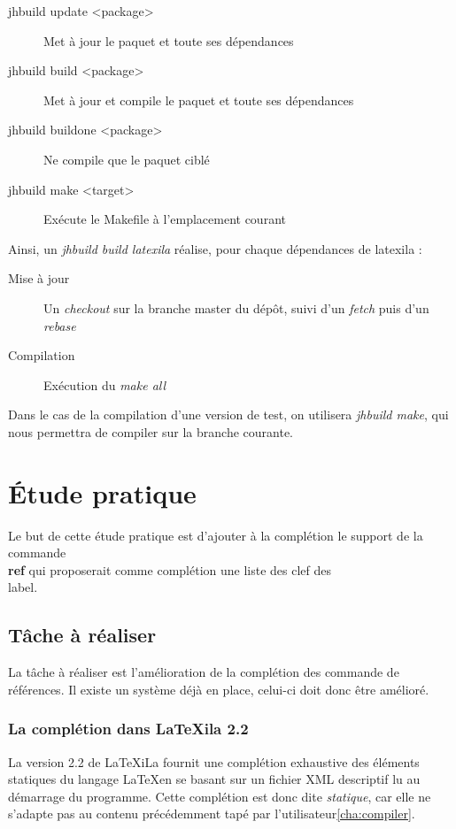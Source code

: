 \documentclass[a4paper,11pt]{report}
\begin{document}
\begin{description}
  \item[jhbuild update <package>] Met à jour le paquet et toute ses dépendances
  \item[jhbuild build <package>] Met à jour et compile le paquet et toute ses dépendances
  \item[jhbuild buildone <package>] Ne compile que le paquet ciblé
  \item[jhbuild make <target>] Exécute le Makefile à l'emplacement courant
\end{description}

Ainsi, un \textit{jhbuild build latexila} réalise, pour chaque dépendances de latexila :

\begin{description} 
  \item[Mise à jour] Un \textit{checkout} sur la branche master du dépôt, suivi d'un \textit{fetch} puis d'un \textit{rebase} 
  \item[Compilation] Exécution du \textit{make all}
\end{description}

Dans le cas de la compilation d'une version de test, on utilisera \textit{jhbuild make}, qui nous permettra de compiler sur la branche courante.

\chapter{Étude pratique} %
\label{cha:etude_pratique}
Le but de cette étude pratique est d'ajouter à la complétion le support de la commande \textbf{\\ref} qui proposerait comme complétion une liste des clef des \\label. 

\section{Tâche à réaliser} %
\label{sec:tache_a_realiser}
La tâche à réaliser est l'amélioration de la complétion des commande de références. Il existe un système déjà en place, celui-ci doit donc être amélioré.

\subsection{La complétion dans LaTeXila 2.2}
\label{sub:completion}
La version 2.2 de LaTeXiLa fournit une complétion exhaustive des éléments statiques du langage \LaTeX  en se basant sur un fichier XML descriptif lu au démarrage du programme.
Cette complétion est donc dite \textit{statique}, car elle ne s'adapte pas au contenu précédemment tapé par l'utilisateur\ref{cha:compiler}. 
\end{document}
